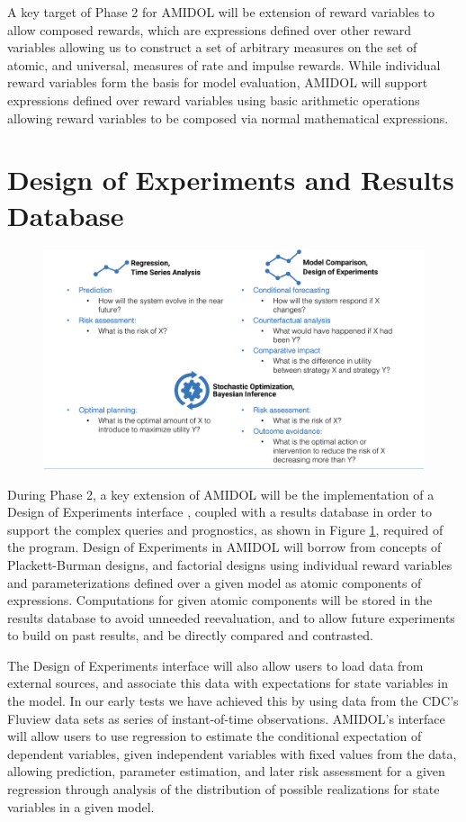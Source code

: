 \documentclass[11pt]{article}
\newcommand{\amidol}{\textsc{AMIDOL}}
\begin{document}
A key target of Phase 2 for \amidol{} will be extension of reward variables to allow composed rewards, which are expressions defined over other reward variables allowing us to construct a set of arbitrary measures on the set of atomic, and universal, measures of rate and impulse rewards. While individual reward variables form the basis for model evaluation, \amidol{} will support expressions defined over reward variables using basic arithmetic operations allowing reward variables to be composed via normal mathematical expressions.

\section{Design of Experiments and Results Database}

\begin{figure}
  \includegraphics[width=\textwidth]{figs/table.pdf}
  \caption{}
  \label{Fig:InferenceClasses}
\end{figure}

During Phase 2, a key extension of \amidol{} will be the implementation of a Design of Experiments interface \cite{montgomery2017design}, coupled with a results database in order to support the complex queries and prognostics, as shown in Figure \ref{Fig:InferenceClasses}, required of the program.  Design of Experiments in \amidol{} will borrow from concepts of Plackett-Burman designs, and factorial designs using individual reward variables and parameterizations defined over a given model as atomic components of expressions.  Computations for given atomic components will be stored in the results database to avoid unneeded reevaluation, and to allow future experiments to build on past results, and be directly compared and contrasted.

The Design of Experiments interface will also allow users to load data from external sources, and associate this data with expectations for state variables in the model.  In our early tests we have achieved this by using data from the CDC's Fluview \cite{cdc2019fluview} data sets as series of instant-of-time observations.  \amidol{}'s interface will allow users to use regression to estimate the conditional expectation of dependent variables, given independent variables with fixed values from the data, allowing prediction, parameter estimation, and later risk assessment for a given regression through analysis of the distribution of possible realizations for state variables in a given model.
\end{document}
